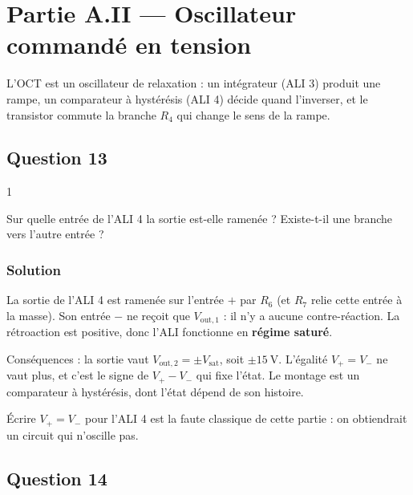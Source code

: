 \documentclass[11pt,a4paper]{article}
\begin{document}
\hypertarget{partie-a.ii-oscillateur-commanduxe9-en-tension}{%
\section{Partie A.II --- Oscillateur commandé en tension}\label{partie-a.ii-oscillateur-commanduxe9-en-tension}}

L'OCT est un oscillateur de relaxation : un intégrateur (ALI 3) produit une rampe, un comparateur à hystérésis (ALI 4) décide quand l'inverser, et le transistor commute la branche \(R_4\) qui change le sens de la rampe.

\hypertarget{question-13}{%
\subsection{Question 13}\label{question-13}}

\begin{indication}{1}

Sur quelle entrée de l'ALI 4 la sortie est-elle ramenée ? Existe-t-il une branche vers l'autre entrée ?

\end{indication}

\hypertarget{solution-12}{%
\subsubsection{Solution}\label{solution-12}}

La sortie de l'ALI 4 est ramenée sur l'entrée \(+\) par \(R_6\) (et \(R_7\) relie cette entrée à la masse). Son entrée \(-\) ne reçoit que \(V_{\mathrm{out},1}\) : il n'y a aucune contre-réaction. La rétroaction est positive, donc l'ALI fonctionne en \textbf{régime saturé}.

Conséquences : la sortie vaut \(V_{\mathrm{out},2}=\pm V_{\mathrm{sat}}\), soit \(\pm15\ \mathrm{V}\). L'égalité \(V_+=V_-\) ne vaut plus, et c'est le signe de \(V_+-V_-\) qui fixe l'état. Le montage est un comparateur à hystérésis, dont l'état dépend de son histoire.

\begin{piege}

Écrire \(V_+=V_-\) pour l'ALI 4 est la faute classique de cette partie : on obtiendrait un circuit qui n'oscille pas.

\end{piege}

\hypertarget{question-14}{%
\subsection{Question 14}\label{question-14}}
\end{document}
